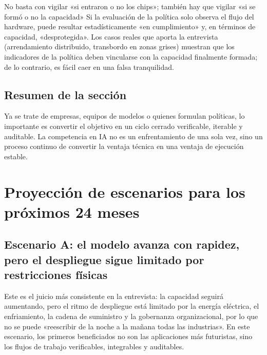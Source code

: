 \documentclass[a4paper]{article}
\begin{document}
\begin{warningbox}{No basta con vigilar «si entraron o no los chips»; también hay que vigilar «si se formó o no la capacidad»}
Si la evaluación de la política solo observa el flujo del hardware, puede resultar estadísticamente «en cumplimiento» y, en términos de capacidad, «desprotegida». Los casos reales que aporta la entrevista (arrendamiento distribuido, transbordo en zonas grises) muestran que los indicadores de la política deben vincularse con la capacidad finalmente formada; de lo contrario, es fácil caer en una falsa tranquilidad.
\end{warningbox}

\subsection{Resumen de la sección}

Ya se trate de empresas, equipos de modelos o quienes formulan políticas, lo importante es convertir el objetivo en un ciclo cerrado verificable, iterable y auditable. La competencia en IA no es un enfrentamiento de una sola vez, sino un proceso continuo de convertir la ventaja técnica en una ventaja de ejecución estable.
\section{Proyección de escenarios para los próximos 24 meses}

\subsection{Escenario A: el modelo avanza con rapidez, pero el despliegue sigue limitado por restricciones físicas}

Este es el juicio más consistente en la entrevista: la capacidad seguirá aumentando, pero el ritmo de despliegue está limitado por la energía eléctrica, el enfriamiento, la cadena de suministro y la gobernanza organizacional, por lo que no se puede «reescribir de la noche a la mañana todas las industrias». En este escenario, los primeros beneficiados no son las aplicaciones más futuristas, sino los flujos de trabajo verificables, integrables y auditables.
\end{document}
